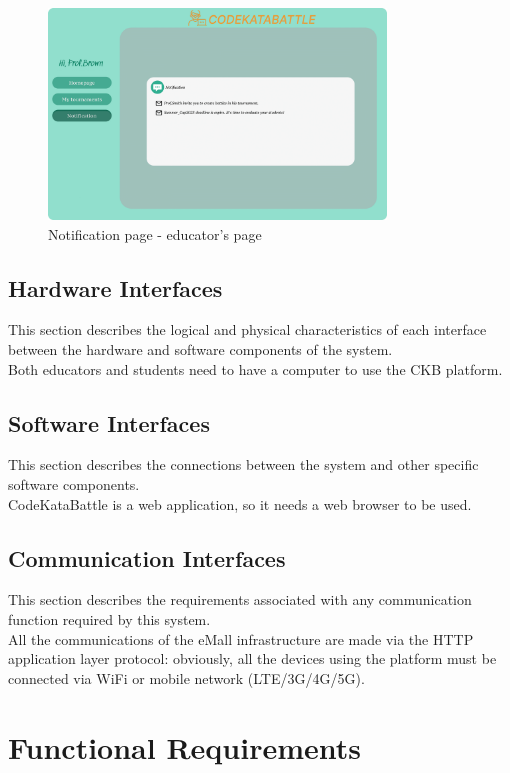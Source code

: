 \begin{figure}[H]
    \centering
    \includegraphics[width=0.8\textwidth]{images/user_interface/UI_sw2-15.png}
    \caption{Notification page - educator's page}
\end{figure}


\subsection{Hardware Interfaces}
This section describes the logical and physical characteristics of each interface 
between the hardware and software components of the system.\\
Both educators and students need to have a computer to use the CKB platform.\\
\subsection{Software Interfaces}
This section describes the connections between the system and other specific software components.\\
CodeKataBattle is a web application, so it needs a web browser to be used.\\
\subsection{Communication Interfaces}
This section describes the requirements associated with any communication function required
by this system.\\
All the communications of the eMall infrastructure are made via the HTTP application layer
protocol: obviously, all the devices using the platform must be connected via WiFi or mobile
network (LTE/3G/4G/5G).\\

\section{Functional Requirements}
